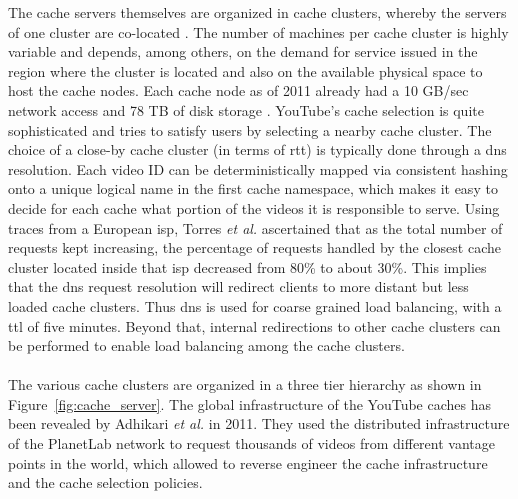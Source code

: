 The cache servers themselves are organized in cache clusters, whereby the servers of one cluster are co-located \cite{inc:video_delivery}. The number of machines per cache cluster is highly variable and depends, among others, on the demand for service issued in the region where the cluster is located and also on the available physical space to host the cache nodes. Each cache node as of 2011 already had a 10 GB/sec network access and 78 TB of disk storage \cite{misc:mmsys_keynote}. YouTube's cache selection is quite sophisticated and tries to satisfy users by selecting a nearby cache cluster. The choice of a close-by cache cluster (in terms of \gls{rtt}) is typically done through a \gls{dns} resolution. Each video ID can be deterministically mapped via consistent hashing onto a unique logical name in the first cache namespace, which makes it easy to decide for each cache what portion of the videos it is responsible to serve. Using traces from a European \gls{isp}, Torres \emph{et al.} \cite{inpr:server_selection} ascertained that as the total number of requests kept increasing, the percentage of requests handled by the closest cache cluster located inside that \gls{isp} decreased from 80\% to about 30\%. This implies that the \gls{dns} request resolution will redirect clients to more distant but less loaded cache clusters. Thus \gls{dns} is used for coarse grained load balancing, with a \gls{ttl} of five minutes. Beyond that, internal redirections to other cache clusters can be performed to enable load balancing among the cache clusters.
\\
\\
The various cache clusters are organized in a three tier hierarchy as shown in Figure~\vref{fig:cache_server}. The global infrastructure of the YouTube caches has been revealed by Adhikari \emph{et al.} \cite{inpr:vivisecting_youtube} in 2011. They used the distributed infrastructure of the PlanetLab network to request thousands of videos from different vantage points in the world, which allowed to reverse engineer the cache infrastructure and the cache selection policies. \\

